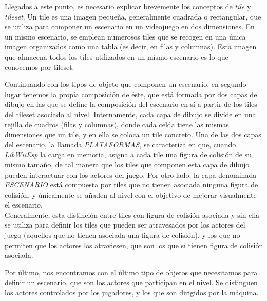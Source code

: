 
Llegados a este punto, es necesario explicar brevemente los conceptos de \emph{tile} y \emph{tileset}. Un tile es una imagen pequeña, generalmente cuadrada o rectangular, que se utiliza para componer un escenario en un videojuego en dos dimensiones. En un mismo escenario, se emplean numerosos tiles que se recogen en una única imagen organizados como una tabla (es decir, en filas y columnas). Esta imagen que almacena todos los tiles utilizados en un mismo escenario es lo que conocemos por tileset.


Continuando con los tipos de objeto que componen un escenario, en segundo lugar tenemos la propia composición de éste, que está formada por dos capas de dibujo en las que se define la composición del escenario en sí a partir de los tiles del tileset asociado al nivel. Internamente, cada capa de dibujo se divide en una rejilla de cuadros (filas y columnas), donde cada celda tiene las mismas dimensiones que un tile, y en ella se coloca un tile concreto. Una de las dos capas del escenario, la llamada \emph{PLATAFORMAS}, se caracteriza en que, cuando \emph{LibWiiEsp} la carga en memoria, asigna a cada tile una figura de colisión de su mismo tamaño, de tal manera que los tiles que componen esta capa de dibujo pueden interactuar con los actores del juego. Por otro lado, la capa denominada \emph{ESCENARIO} está compuesta por tiles que no tienen asociada ninguna figura de colisión, y únicamente se añaden al nivel con el objetivo de mejorar visualmente el escenario.\\

Generalmente, esta distinción entre tiles con figura de colisión asociada y sin ella se utiliza para definir los tiles que pueden ser atravesados por los actores del juego (aquellos que no tienen asociada una figura de colisión), y los que no permiten que los actores los atraviesen, que son los que sí tienen figura de colisión asociada.\\


Por último, nos encontramos con el último tipo de objetos que necesitamos para definir un escenario, que son los actores que participan en el nivel. Se distinguen los actores controlados por los jugadores, y los que son dirigidos por la máquina.\\

